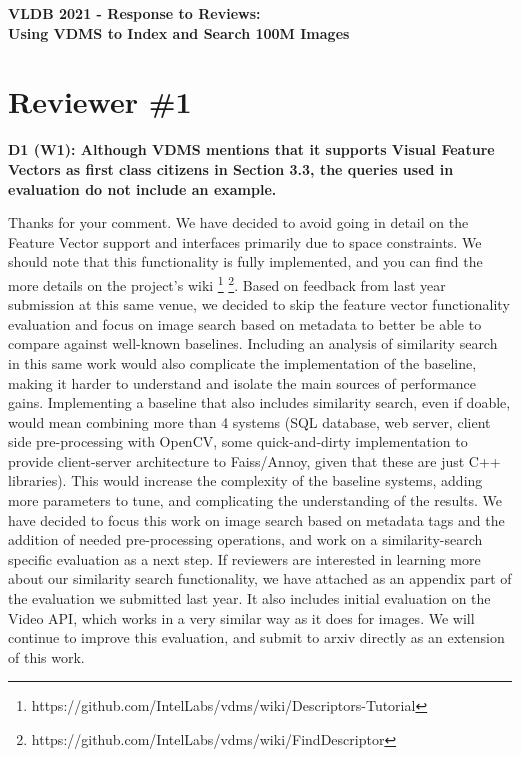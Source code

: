 \documentclass[11pt]{proposalnsf}
\begin{document}
\begin{center}
{\Large{\bf VLDB 2021 - Response to Reviews: \\
Using VDMS to Index and Search 100M Images}}

\end{center}

\section{Reviewer \#1}

\noindent %
\textbf{
D1 (W1): Although VDMS mentions that it supports Visual Feature Vectors as
first class citizens in Section 3.3, the queries used in evaluation
do not include an example.
}\bigskip

Thanks for your comment.
We have decided to avoid going in detail on the Feature Vector support
and interfaces primarily due to space constraints.
We should note that this functionality is fully implemented,
and you can find the more details on the project's wiki
\footnote{https://github.com/IntelLabs/vdms/wiki/Descriptors-Tutorial}
\footnote{https://github.com/IntelLabs/vdms/wiki/FindDescriptor}.
Based on feedback from last year submission at this same venue, we decided
to skip the feature vector functionality evaluation and focus on image search
based on metadata to better be able to compare against well-known baselines.
Including an analysis of similarity search in this same work would also
complicate the implementation of the baseline, making it harder to understand
and isolate the main sources of performance gains.
Implementing a baseline that also includes similarity search, even if doable,
would mean combining more than 4 systems (SQL database, web server, client side
pre-processing with OpenCV, some quick-and-dirty implementation
to provide client-server architecture to Faiss/Annoy, given that these
are just C++ libraries).
This would increase the complexity of the baseline systems, adding
more parameters to tune, and complicating the understanding of the results.
We have decided to focus this work on image search based on metadata tags
and the addition of needed pre-processing operations, and
work on a similarity-search specific evaluation as a next step.
If reviewers are interested in learning more about our similarity search functionality,
we have attached as an appendix part of the evaluation we submitted last year.
It also includes initial evaluation on the Video API, which works in a very
similar way as it does for images.
We will continue to improve this evaluation, and submit to arxiv directly
as an extension of this work.
\end{document}

